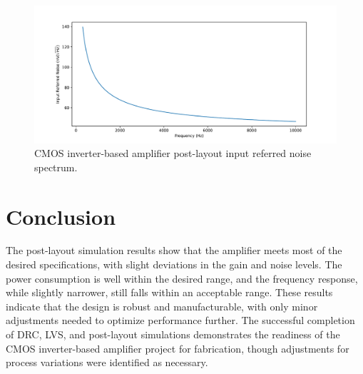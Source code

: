 \begin{figure}[ht!]
    \centering
    \includegraphics[width=\textwidth]{Figures/inoise_pl.pdf}
    \caption{CMOS inverter-based amplifier post-layout input referred noise spectrum.}
    \label{fig:post_layout_noise}
\end{figure}

\section{Conclusion}
The post-layout simulation results show that the amplifier meets most of the desired specifications, with slight deviations in the gain and noise levels. 
The power consumption is well within the desired range, and the frequency response, while slightly narrower, still falls within an acceptable range. 
These results indicate that the design is robust and manufacturable, with only minor adjustments needed to optimize performance further. 
The successful completion of DRC, LVS, and post-layout simulations demonstrates the readiness of the CMOS inverter-based amplifier project for fabrication, though adjustments for process variations were identified as necessary. 
